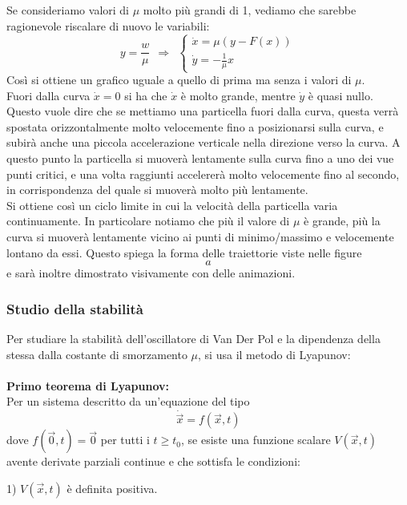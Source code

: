 \documentclass[12pt]{article}
\newcommand{\vo}{\vec{0}}
\begin{document}
Se consideriamo valori di $\mu$ molto più grandi di 1, vediamo che sarebbe ragionevole riscalare di nuovo le variabili:
\begin{equation}
	y = \frac{w}{\mu} \ \ \Longrightarrow \ \ \begin{cases}
		\dot{x} = \mu(y - F(x)) \\
		\dot{y} = -\frac{1}{\mu}x	
	\end{cases}
\end{equation}
Così si ottiene un grafico uguale a quello di prima ma senza i valori di $\mu$. \\
Fuori dalla curva $\dot{x} = 0$ si ha che $\dot{x}$ è molto grande, mentre $\dot{y}$ è quasi nullo. Questo vuole dire che se mettiamo una particella fuori dalla curva, questa verrà spostata orizzontalmente molto velocemente fino a posizionarsi sulla curva, e subirà anche una piccola accelerazione verticale nella direzione verso la curva. A questo punto la particella si muoverà lentamente sulla curva fino a uno dei vue punti critici, e una volta raggiunti accelererà molto velocemente fino al secondo, in corrispondenza del quale si muoverà molto più lentamente. \\
Si ottiene così un ciclo limite in cui la velocità della particella varia continuamente. In particolare notiamo che più il valore di $\mu$ è grande, più la curva si muoverà lentamente vicino ai punti di minimo/massimo e velocemente lontano da essi. Questo spiega la forma delle traiettorie viste nelle figure $$ a $$ e sarà inoltre dimostrato visivamente con delle animazioni.
\subsubsection{Studio della stabilità}
Per studiare la stabilità dell'oscillatore di Van Der Pol e la dipendenza della stessa dalla costante di smorzamento $\mu$, si usa il metodo di Lyapunov: \\ \\
\textbf{Primo teorema di Lyapunov: \\}
Per un sistema descritto da un'equazione del tipo 
\begin{equation}
	\dot{\vec{x}} = f(\vec{x},t)
\end{equation}
dove $f(\vo,t) = \vo$ per tutti i $t \geq t_0$, se esiste una funzione scalare $V(\vec{x},t)$ avente derivate parziali continue e che sottisfa le condizioni: 

1) $V(\vec{x},t)$ è definita positiva. 
\end{document}

